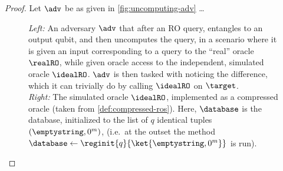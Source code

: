   \begin{proof}
    Let $\adv$ be as given in \autoref{fig:uncomputing-adv} \ldots

    \begin{figure}[t]
      \centering
      \begin{pchstack}[center]

        \pchspace

      \end{pchstack}
      \caption{
        \label{fig:uncomputing-adv}
        \emph{Left:} An adversary $\adv$ that after an RO query, entangles to an output
        qubit, and then
        uncomputes the query, in a scenario where it is given an
        input corresponding to a query to the ``real'' oracle $\realRO$, while
        given oracle access to the independent, simulated oracle $\idealRO$.
        $\adv$ is then tasked with noticing the difference, which it can
        trivially do by calling $\idealRO$ on $\target$. \\
        \emph{Right:} The simulated oracle $\idealRO$, implemented as a compressed
        oracle (taken from \autoref{def:compressed-ros}). Here, $\database$ is
        the database, initialized to the list of $q$ identical tuples
        $(\emptystring, 0^m)$, (i.e.\ at the outset the method $\database \gets
        \reginit{q}{\ket{\emptystring, 0^m}}$ is run). 
      }
    \end{figure}


\end{proof}
